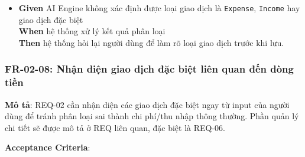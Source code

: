 \begin{itemize}
\item \textbf{Given} AI Engine không xác định được loại giao dịch là \texttt{Expense}, \texttt{Income} hay giao dịch đặc biệt  \\ \hspace*{1.5em}  \textbf{When} hệ thống xử lý kết quả phân loại  \\ \hspace*{1.5em}  \textbf{Then} hệ thống hỏi lại người dùng để làm rõ loại giao dịch trước khi lưu.
\end{itemize}
\subsubsection{FR-02-08: Nhận diện giao dịch đặc biệt liên quan đến dòng tiền}

\textbf{Mô tả}: REQ-02 cần nhận diện các giao dịch đặc biệt ngay từ input của người dùng để tránh phân loại sai thành chi phí/thu nhập thông thường. Phần quản lý chi tiết sẽ được mô tả ở REQ liên quan, đặc biệt là REQ-06.



\textbf{Acceptance Criteria}:

